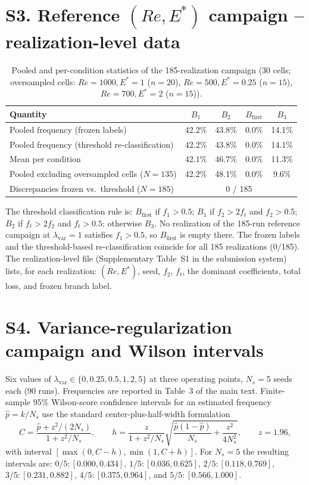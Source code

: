 \documentclass[11pt]{article}
\begin{document}
\section{S3. Reference $(Re,E^*)$ campaign -- realization-level data}
\label{sec:S3}

\begin{table}[h]
\centering\small
\caption{Pooled and per-condition statistics of the 185-realization campaign
(30 cells; oversampled cells: $Re=1000,E^*=1$ ($n=20$),
$Re=500,E^*=0.25$ ($n=15$), $Re=700,E^*=2$ ($n=15$)).}
\label{tab:S3}
\begin{tabular}{lcccc}
\toprule
Quantity & $B_1$ & $B_2$ & $B_{\mathrm{first}}$ & $B_3$\\
\midrule
Pooled frequency (frozen labels) & 42.2\% & 43.8\% & 0.0\% & 14.1\%\\
Pooled frequency (threshold re-classification) & 42.2\% & 43.8\% & 0.0\% & 14.1\%\\
Mean per condition & 42.1\% & 46.7\% & 0.0\% & 11.3\%\\
Pooled excluding oversampled cells ($N=135$) & 42.2\% & 48.1\% & 0.0\% & 9.6\%\\
Discrepancies frozen vs.\ threshold ($N=185$) & \multicolumn{4}{c}{0 / 185}\\
\bottomrule
\end{tabular}
\end{table}

The threshold classification rule is: $B_{\mathrm{first}}$ if $f_1>0.5$;
$B_1$ if $f_2>2f_t$ and $f_2>0.5$;
$B_2$ if $f_t>2f_2$ and $f_t>0.5$; otherwise $B_3$. No realization of the
185-run reference campaign at $\lambda_{\mathrm{var}}=1$ satisfies $f_1>0.5$, so
$B_{\mathrm{first}}$ is empty there. The frozen labels and the
threshold-based re-classification coincide for all 185 realizations (0/185).
The realization-level file (Supplementary Table~S1 in the submission system)
lists, for each realization: $(Re, E^*)$, seed, $f_2$, $f_t$, the dominant
coefficients, total loss, and frozen branch label.

\section{S4. Variance-regularization campaign and Wilson intervals}
\label{sec:S4}

Six values of $\lambda_{\mathrm{var}}\in\{0,0.25,0.5,1,2,5\}$ at three
operating points, $N_s=5$ seeds each (90 runs). Frequencies are reported in
Table~3 of the main text. Finite-sample 95\% Wilson-score confidence
intervals for an estimated frequency $\hat p=k/N_s$ use the standard
center-plus-half-width formulation
\[
C=\frac{\hat p+z^2/(2N_s)}{1+z^2/N_s},\qquad
h=\frac{z}{1+z^2/N_s}\sqrt{\frac{\hat p(1-\hat p)}{N_s}+\frac{z^2}{4N_s^2}},
\qquad z=1.96,
\]
with interval $[\max(0,C-h),\min(1,C+h)]$. For $N_s=5$ the resulting
intervals are: $0/5\colon[0.000,0.434]$,
$1/5\colon[0.036,0.625]$,
$2/5\colon[0.118,0.769]$,
$3/5\colon[0.231,0.882]$,
$4/5\colon[0.375,0.964]$, and
$5/5\colon[0.566,1.000]$.
\end{document}
